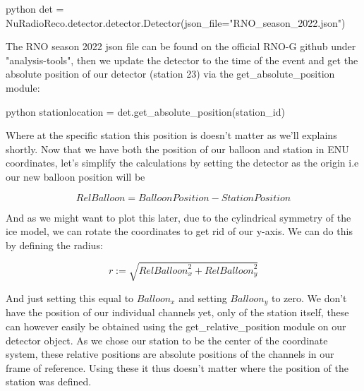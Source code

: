 \begin{mintedbox}{python}
det = NuRadioReco.detector.detector.Detector(json_file="RNO_season_2022.json")
\end{mintedbox}

The RNO season 2022 json file can be found on the official RNO-G github under
"analysis-tools", then we update the detector to the time of the event and get
the absolute position of our detector (station 23) via the
get\_absolute\_position module:

\begin{mintedbox}{python}
	stationlocation = det.get_absolute_position(station_id)
\end{mintedbox}

Where at the specific station this position is doesn't matter as we'll explains
shortly.  Now that we have both the position of our balloon and station in ENU
coordinates, let's simplify the calculations by setting the detector as the
origin i.e our new balloon position will be

\begin{equation}
	\textit{RelBalloon} = \textit{BalloonPosition} - \textit{StationPosition}
\end{equation}

And as we might want to plot this later, due to the cylindrical symmetry of the
ice model, we can rotate the coordinates to get rid of our y-axis. We can do
this by defining the radius:

\begin{equation}
	r := \sqrt{\textit{RelBalloon}_x^2 + \textit{RelBalloon}_y^2}
\end{equation}

And just setting this equal to $\textit{Balloon}_x$ and setting $\textit{Balloon}_y$ to
zero. 
We don't have the position of our individual channels yet, only of the
station itself, these can however easily be obtained using the
get\_relative\_position module on our detector object. As we chose our station
to be the center of the coordinate system, these relative positions are
absolute positions of the channels in our frame of reference. Using
these it thus doesn't matter where the position of the station was defined.

